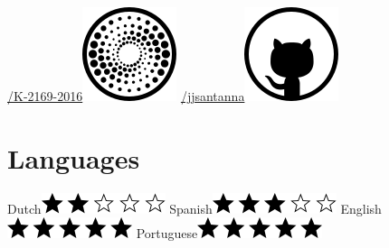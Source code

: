 \documentclass[print]{styles/friggeri-cv-mac} %
\begin{document}
\begin{aside}
\href{http://www.researcherid.com/rid/K-2169-2016}{/K-2169-2016}\includegraphics[scale=0.3]{img/researchid.png}
\href{https://github.com/jjsantanna}{/jjsantanna\includegraphics[scale=0.3]{img/github.png}}
~
\section{Languages}
Dutch\includegraphics[scale=0.40]{img/2stars.png}
Spanish\includegraphics[scale=0.40]{img/3stars.png}
English\includegraphics[scale=0.40]{img/5stars.png}
Portuguese\includegraphics[scale=0.40]{img/5stars.png}
\end{aside}
\end{document}
